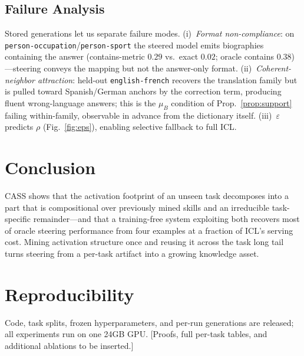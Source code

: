 \documentclass[sigconf,review,anonymous]{acmart}
\newcommand{\method}{\textsc{CASS}}
\begin{document}
\subsection{Failure Analysis}
\label{sec:analysis}
Stored generations let us separate failure modes. (i)~\emph{Format
non-compliance}: on \texttt{person-occupation}/\texttt{person-sport} the
steered model emits biographies containing the answer (contains-metric
$0.29$ vs.\ exact $0.02$; oracle contains $0.38$)---steering conveys the
mapping but not the answer-only format. (ii)~\emph{Coherent-neighbor
attraction}: held-out \texttt{english-french} recovers the translation
family but is pulled toward Spanish/German anchors by the correction term,
producing fluent wrong-language answers; this is the $\mu_B$ condition of
Prop.~\ref{prop:support} failing within-family, observable in advance from
the dictionary itself. (iii)~$\varepsilon$ predicts $\rho$
(Fig.~\ref{fig:eps}), enabling selective fallback to full ICL.

\section{Conclusion}
\method{} shows that the activation footprint of an unseen task decomposes
into a part that is compositional over previously mined skills and an
irreducible task-specific remainder---and that a training-free system
exploiting both recovers most of oracle steering performance from four
examples at a fraction of ICL's serving cost. Mining activation structure
once and reusing it across the task long tail turns steering from a
per-task artifact into a growing knowledge asset.




\appendix
\section{Reproducibility}
Code, task splits, frozen hyperparameters, and per-run generations are
released; all experiments run on one 24GB GPU. [Proofs, full per-task
tables, and additional ablations to be inserted.]
\end{document}
